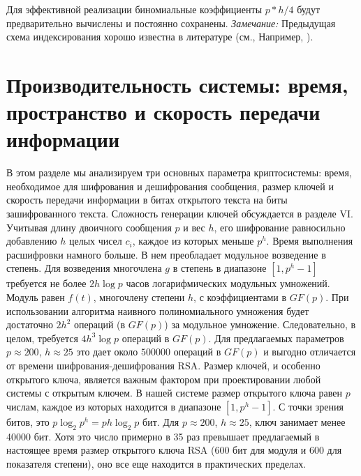 \documentclass[a4paper,12pt]{article}
\newcommand{\DL}{\newline\newline}
\begin{document}
\begin{algorithmic}[1]
\EndIf
\EndFor
{}
\end{algorithmic}


Для эффективной реализации биномиальные коэффициенты $p*h/4$ будут предварительно вычислены и постоянно сохранены. \newline
\indent \textsl{Замечание: } Предыдущая схема индексирования хорошо известна
в литературе (см., Например, \cite{10}). \DL

\section{Производительность системы: время, пространство и скорость передачи информации}
В этом разделе мы анализируем три основных параметра криптосистемы: время, необходимое для шифрования и дешифрования сообщения, размер ключей и скорость передачи информации в битах открытого текста на биты зашифрованного текста. Сложность генерации ключей обсуждается в разделе VI. \newline
\indent
Учитывая длину двоичного сообщения $p$ и вес $h$, его шифрование равносильно добавлению $h$ целых чисел $c_i$, каждое из которых меньше $p^h$. Время выполнения расшифровки намного больше. В нем преобладает модульное возведение в степень. Для возведения многочлена $g$ в степень в диапазоне $[1, p^h-1]$ требуется не более $2h\log p$ часов логарифмических модульных умножений. Модуль равен $f(t)$, многочлену степени $h$, с коэффициентами в $GF(p)$. При использовании алгоритма наивного полиномиального умножения будет достаточно $2h^2$ операций (в $GF(p)$) за модульное умножение. Следовательно, в целом, требуется $4h^3 \log p$ операций в $GF(p)$. Для предлагаемых параметров $p \approx 200$, $h \approx 25$ это дает около $500000$ операций в $GF(p)$ и выгодно отличается от времени шифрования-дешифрования RSA. \newline
\indent Размер ключей, и особенно открытого ключа, является важным фактором при проектировании любой системы с открытым ключем. В нашей системе размер открытого ключа равен $p$ числам, каждое из которых находится в диапазоне $[1,p^h - 1]$.
С точки зрения битов, это $p \log_2 p^h = ph \log_2 p$ бит. Для $p \approx 200$, $h \approx 25$, ключ занимает менее 40000 бит. Хотя это число примерно в 35 раз превышает предлагаемый в настоящее время размер открытого ключа RSA (600 бит для модуля и 600 для показателя степени), оно все еще находится в практических пределах. \newline
\end{document}
